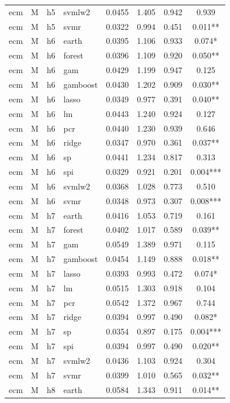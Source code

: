 \begin{ThreePartTable}
\begin{longtable}[t]{llclcccc}
ecm & M & h5 & svmlw2 & 0.0455 & 1.405 & 0.942 & 0.939\\
ecm & M & h5 & svmr & 0.0322 & 0.994 & 0.451 & 0.011**\\
\addlinespace
ecm & M & h6 & earth & 0.0395 & 1.106 & 0.933 & 0.074*\\
ecm & M & h6 & forest & 0.0396 & 1.109 & 0.920 & 0.050**\\
ecm & M & h6 & gam & 0.0429 & 1.199 & 0.947 & 0.125\\
ecm & M & h6 & gamboost & 0.0430 & 1.202 & 0.909 & 0.030**\\
ecm & M & h6 & lasso & 0.0349 & 0.977 & 0.391 & 0.040**\\
ecm & M & h6 & lm & 0.0443 & 1.240 & 0.924 & 0.127\\
ecm & M & h6 & pcr & 0.0440 & 1.230 & 0.939 & 0.646\\
ecm & M & h6 & ridge & 0.0347 & 0.970 & 0.361 & 0.037**\\
ecm & M & h6 & sp & 0.0441 & 1.234 & 0.817 & 0.313\\
ecm & M & h6 & spi & 0.0329 & 0.921 & 0.201 & 0.004***\\
ecm & M & h6 & svmlw2 & 0.0368 & 1.028 & 0.773 & 0.510\\
ecm & M & h6 & svmr & 0.0348 & 0.973 & 0.307 & 0.008***\\
\addlinespace
ecm & M & h7 & earth & 0.0416 & 1.053 & 0.719 & 0.161\\
ecm & M & h7 & forest & 0.0402 & 1.017 & 0.589 & 0.039**\\
ecm & M & h7 & gam & 0.0549 & 1.389 & 0.971 & 0.115\\
ecm & M & h7 & gamboost & 0.0454 & 1.149 & 0.888 & 0.018**\\
ecm & M & h7 & lasso & 0.0393 & 0.993 & 0.472 & 0.074*\\
ecm & M & h7 & lm & 0.0515 & 1.303 & 0.918 & 0.104\\
ecm & M & h7 & pcr & 0.0542 & 1.372 & 0.967 & 0.744\\
ecm & M & h7 & ridge & 0.0394 & 0.997 & 0.490 & 0.082*\\
ecm & M & h7 & sp & 0.0354 & 0.897 & 0.175 & 0.004***\\
ecm & M & h7 & spi & 0.0394 & 0.997 & 0.490 & 0.020**\\
ecm & M & h7 & svmlw2 & 0.0436 & 1.103 & 0.924 & 0.304\\
ecm & M & h7 & svmr & 0.0399 & 1.010 & 0.565 & 0.032**\\
\addlinespace
ecm & M & h8 & earth & 0.0584 & 1.343 & 0.911 & 0.014**\\

\end{longtable}
\end{ThreePartTable}
